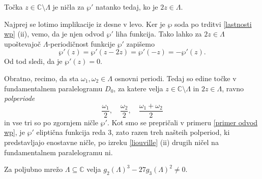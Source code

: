 \documentclass[mat1]{fmfdelo}
\numberwithin{equation}{section}
\newcommand{\C}{\mathbb C}
\newcommand{\om}{\omega}
\theoremstyle{definition}
\begin{document}
%
%
\begin{lema}
    \label{polperiode so nicle odvoda wp}
    Točka $z \in \C\setminus\Lambda$ je ničla za $\wp'$ natanko tedaj, ko je $2z \in \Lambda$.
\end{lema}

\begin{dokaz}
    Najprej se lotimo implikacije iz desne v levo. Ker je $\wp$ soda po trditvi \ref{lastnosti wp} (ii), vemo, da je njen odvod $\wp'$ liha funkcija. Tako lahko za $2z\in \Lambda$ upoštevajoč $\Lambda$-periodičnost funkcije $\wp'$ zapišemo
    \[
        \wp'(z) = \wp'(z - 2z) = \wp'(-z) = -\wp'(z).
    \]
    Od tod sledi, da je $\wp'(z) = 0$.

    Obratno, recimo, da sta $\om_1, \om_2 \in \Lambda$ osnovni periodi. Tedaj so edine točke v fundamentalnem paralelogramu $D_0$, za katere velja $z \in \C\setminus\Lambda$ in $2z\in\Lambda$, ravno \emph{polperiode}
    \[
        \frac{\om_1}{2}, \quad \frac{\om_2}{2}, \quad \frac{\om_1 + \om_2}{2} 
    \]
    in vse tri so po zgornjem ničle $\wp'$. Kot smo se prepričali v primeru \ref{primer odvod wp}, je $\wp'$ eliptična funkcija reda $3$, zato razen treh našteih polperiod, ki predstavljajo enostavne ničle, po izreku \ref{liouville} (ii) drugih ničel na fundamentalnem paralelogramu ni.   
\end{dokaz}

\begin{lema}
    \label{nenicelna diskriminanta}
    Za poljubno mrežo $\Lambda \subseteq \C$ velja $g_2(\Lambda)^3 - 27g_3(\Lambda)^2 \neq 0$.
\end{lema}
\end{document}
